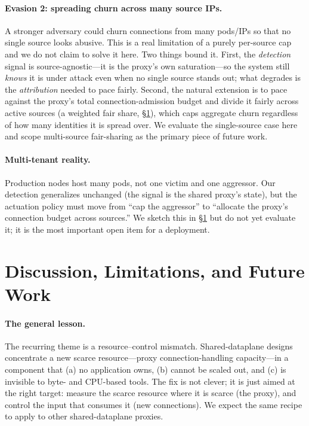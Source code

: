 \documentclass[10pt,twocolumn]{article}
\begin{document}
\paragraph{Evasion 2: spreading churn across many source IPs.} A stronger adversary could
churn connections from many pods/IPs so that no single source looks abusive. This is a
real limitation of a purely per-source cap and we do not claim to solve it here. Two
things bound it. First, the \emph{detection} signal is source-agnostic---it is the
proxy's own saturation---so the system still \emph{knows} it is under attack even when no
single source stands out; what degrades is the \emph{attribution} needed to pace fairly.
Second, the natural extension is to pace against the proxy's total connection-admission
budget and divide it fairly across active sources (a weighted fair share, \S\ref{sec:disc}),
which caps aggregate churn regardless of how many identities it is spread over. We
evaluate the single-source case here and scope multi-source fair-sharing as the primary
piece of future work.

\paragraph{Multi-tenant reality.} Production nodes host many pods, not one victim and one
aggressor. Our detection generalizes unchanged (the signal is the shared proxy's state),
but the actuation policy must move from ``cap the aggressor'' to ``allocate the proxy's
connection budget across sources.'' We sketch this in \S\ref{sec:disc} but do not yet
evaluate it; it is the most important open item for a deployment.

\section{Discussion, Limitations, and Future Work}
\label{sec:disc}
\paragraph{The general lesson.} The recurring theme is a resource--control mismatch.
Shared-dataplane designs concentrate a new scarce resource---proxy connection-handling
capacity---in a component that (a) no application owns, (b) cannot be scaled out, and
(c) is invisible to byte- and CPU-based tools. The fix is not clever; it is just aimed at
the right target: measure the scarce resource where it is scarce (the proxy), and control
the input that consumes it (new connections). We expect the same recipe to apply to other
shared-dataplane proxies.
\end{document}
